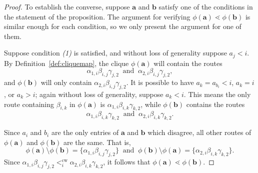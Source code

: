 \documentclass[10pt,a4paper]{amsart}
\DeclareMathOperator{\cw}{cw}
\newcommand\ba{\mathbf{a}}
\newcommand\bb{\mathbf{b}}
\begin{document}
\begin{proof}
    To establish the converse, suppose $\ba$ and $\bb$ satisfy one of the conditions in the statement of the proposition.
    The argument for verifying $\phi(\ba) \lessdot \phi(\bb)$ is similar enough for each condition, so we only present the argument for one of them.
    
    Suppose condition \emph{(1)} is satisfied, and without loss of generality suppose $a_j < i$.
    By Definition~\ref{def:cliquemap}, the clique $\phi(\ba)$ will contain the routes
    \[
        \alpha_{1,i}\beta_{i,j}\gamma_{j,2}~\text{ and }~\alpha_{2,i}\beta_{i,j}\gamma_{j,2},
    \]
    and $\phi(\bb)$ will only contain $\alpha_{2,i}\beta_{i,j}\gamma_{j,2}$.
    It is possible to have $a_k = a_{b_i} < i$, $a_k = i$, or $a_k > i$; again without loss of generality, suppose $a_k < i$.
    This means the only route containing $\beta_{i,k}$ in $\phi(\ba)$ is $\alpha_{1,i}\beta_{i,k}\gamma_{k,2}$, while $\phi(\bb)$ contains the routes
    \[
        \alpha_{1,i}\beta_{i,k}\gamma_{k,2}~\text{ and }~\alpha_{2,i}\beta_{i,k}\gamma_{k,2}.
    \]
    
    Since $a_i$ and $b_i$ are the only entries of $\ba$ and $\bb$ which disagree, all other routes of $\phi(\ba)$ and $\phi(\bb)$ are the same.
    That is,
    \[
        \phi(\ba) \setminus \phi(\bb) = \{\alpha_{1,i}\beta_{i,j}\gamma_{j,2}\}~\text{ and }~\phi(\bb) \setminus \phi(\ba) = \{\alpha_{2,i}\beta_{i,k}\gamma_{k,2}\}.
    \]
    Since $\alpha_{1,i}\beta_{i,j}\gamma_{j,2} <_i^{\cw} \alpha_{2,i}\beta_{i,k}\gamma_{k,2}$, it follows that $\phi(\ba) \lessdot \phi(\bb)$.
\end{proof}
\end{document}
